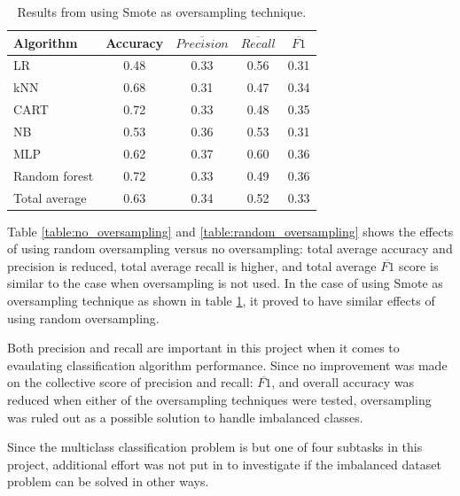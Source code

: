 	\begin{table}[H]
	\centering
	\caption{Results from using Smote as oversampling technique.}
		\begin{tabular}[5]{l | c | c | c | c}
    			Algorithm & Accuracy & $\overline{Precision}$ & $\overline{Recall}$ & $\overline{F1}$ \\
    			\hline
			LR & 0.48 & 0.33 & 0.56 & 0.31 \\
			kNN & 0.68 &  0.31 & 0.47 &  0.34 \\
			CART & 0.72 & 0.33 & 0.48 &  0.35 \\
			NB &  0.53 & 0.36 & 0.53 & 0.31 \\
			MLP & 0.62 & 0.37 & 0.60 & 0.36 \\
			Random forest & 0.72 & 0.33 & 0.49 &  0.36 \\
			\hline
			Total average & 0.63 & 0.34 & 0.52 & 0.33 
			\label{table:smote_oversampling}
		\end{tabular}
	\end{table}
	
	Table \ref{table:no_oversampling} and \ref{table:random_oversampling} shows the effects of using random oversampling versus no oversampling: total average accuracy and precision is reduced, total average recall is higher, and total average $\overline{F1}$ score is similar to the case when oversampling is not used. In the case of using Smote as oversampling technique as shown in table \ref{table:smote_oversampling}, it proved to have similar effects of using random oversampling. 

	Both precision and recall are important in this project when it comes to evaulating classification algorithm performance. Since no improvement was made on the collective score of precision and recall: $\overline{F1}$, and overall accuracy was reduced when either of the oversampling techniques were tested, oversampling was ruled out as a possible solution to handle imbalanced classes. 

	Since the multiclass classification problem is but one of four subtasks in this project, additional effort was not put in to investigate if the imbalanced dataset problem can be solved in other ways.
